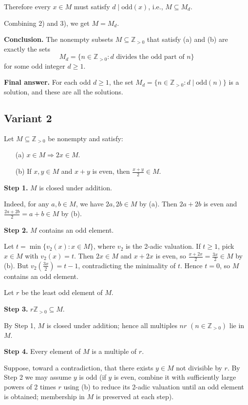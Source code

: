 \documentclass[12pt,a4paper]{article}
\theoremstyle{definition}
\begin{document}
    Therefore every $x \in M$ must satisfy $d \mid \text{odd}(x)$, i.e., $M \subseteq M_d$.

    Combining 2) and 3), we get $M = M_d$.

    \textbf{Conclusion.} The nonempty subsets $M \subseteq \mathbb{Z}_{>0}$ that satisfy (a) and (b) are exactly the sets
    $$M_d = \{ n \in \mathbb{Z}_{>0} : d \text{ divides the odd part of } n \}$$
    for some odd integer $d \geq 1$.

    \textbf{Final answer.}
    For each odd $d \geq 1$, the set $M_d = \{ n \in \mathbb{Z}_{>0} : d \mid \text{odd}(n) \}$ is a solution, and these are all the solutions.
    \subsection{Variant 2}
    Let $M \subseteq \mathbb{Z}_{>0}$ be nonempty and satisfy:
    \begin{enumerate}
        \item[(a)] $x \in M \Rightarrow 2x \in M$.
        \item[(b)] If $x,y \in M$ and $x+y$ is even, then $\frac{x+y}{2} \in M$.
    \end{enumerate}

    \textbf{Step 1.} $M$ is closed under addition.

    Indeed, for any $a,b \in M$, we have $2a,2b \in M$ by (a). Then $2a+2b$ is even and
    $\frac{2a+2b}{2} = a+b \in M$ by (b).

    \textbf{Step 2.} $M$ contains an odd element.

    Let $t = \min\{v_2(x) : x \in M\}$, where $v_2$ is the 2-adic valuation. If $t \geq 1$, pick $x \in M$ with $v_2(x)=t$. Then $2x \in M$ and $x+2x$ is even, so $\frac{x+2x}{2} = \frac{3x}{2} \in M$ by (b). But $v_2\left(\frac{3x}{2}\right) = t-1$, contradicting the minimality of $t$. Hence $t=0$, so $M$ contains an odd element.

    Let $r$ be the least odd element of $M$.

    \textbf{Step 3.} $r\mathbb{Z}_{>0} \subseteq M$.

    By Step 1, $M$ is closed under addition; hence all multiples $nr$ $(n \in \mathbb{Z}_{>0})$ lie in $M$.

    \textbf{Step 4.} Every element of $M$ is a multiple of $r$.

    Suppose, toward a contradiction, that there exists $y \in M$ not divisible by $r$. By Step 2 we may assume $y$ is odd (if $y$ is even, combine it with sufficiently large powers of 2 times $r$ using (b) to reduce its 2-adic valuation until an odd element is obtained; membership in $M$ is preserved at each step).
\end{document}

